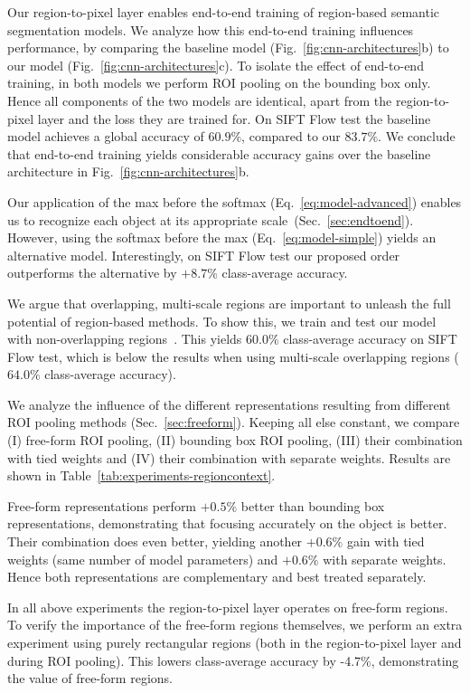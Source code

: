 Our region-to-pixel layer enables end-to-end training of region-based semantic segmentation models.
We analyze how this end-to-end training influences performance, by comparing the baseline model
(Fig.~\ref{fig:cnn-architectures}b) to our model (Fig.~\ref{fig:cnn-architectures}c). To isolate the effect of end-to-end training, in
both models we perform ROI pooling on the bounding box only.
Hence all components of the two models are identical, apart from the region-to-pixel layer and the loss they are trained for.
On SIFT Flow test the baseline model achieves a global accuracy of $60.9\%$, compared to our $83.7\%$. 
We conclude that end-to-end training yields considerable accuracy gains over the baseline architecture in Fig.~\ref{fig:cnn-architectures}b.

Our application of the max before the softmax (Eq.~\ref{eq:model-advanced}) enables us to recognize each object at its appropriate scale~(Sec.~\ref{sec:endtoend}).
However, using the softmax before the max (Eq.~\ref{eq:model-simple}) yields an alternative model.
Interestingly, on SIFT Flow test our proposed order outperforms the alternative by $+8.7\%$ class-average accuracy.

We argue that overlapping, multi-scale regions are important to unleash the full potential of region-based methods.
To show this, we train and test our model with non-overlapping regions~\cite{felzenszwalb04ijcv}.
This yields $60.0\%$ class-average accuracy on SIFT Flow test,
which is below the results when using multi-scale overlapping regions ($64.0\%$ class-average accuracy).


We analyze the influence of the different representations resulting from different ROI pooling
methods (Sec.~\ref{sec:freeform}). Keeping all else constant, we compare
(I) free-form ROI pooling, (II) bounding box ROI pooling, (III) their combination with tied weights
and (IV) their combination with separate weights. Results are shown in
Table~\ref{tab:experiments-regioncontext}.

Free-form representations perform $+0.5\%$ better than bounding box representations, demonstrating that
focusing accurately on the object is better.
Their combination does even better, yielding another $+0.6\%$ gain with tied weights (same number of model parameters) and $+0.6\%$ with separate weights. Hence both representations are complementary and best treated separately.

In all above experiments the region-to-pixel layer operates on free-form regions.
To verify the importance of the free-form regions themselves, we perform an extra experiment using purely rectangular regions (both in the region-to-pixel layer and during ROI pooling).
This lowers class-average accuracy by -4.7\%, demonstrating the value of free-form regions.